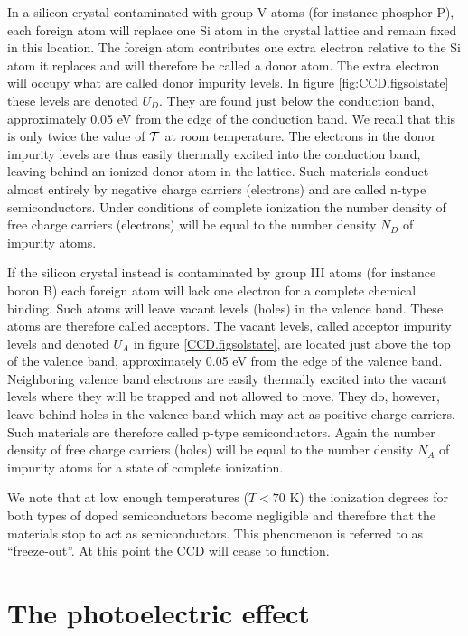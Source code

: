 In a silicon crystal contaminated with group V atoms (for instance
phosphor P), each foreign atom will replace one Si atom in the crystal
lattice and remain fixed in this location. The foreign atom
contributes one extra electron relative to the Si atom it replaces and
will therefore be called a donor atom. The extra electron will occupy
what are called donor impurity levels. In figure \ref{fig:CCD.figsolstate}
these levels are denoted $U_D$. They are found just below the
conduction band, approximately 0.05 eV from the edge of the conduction
band. We recall that this is only twice the value of ${\cal T}$ at room
temperature. The electrons in the donor impurity levels are thus
easily thermally excited into the conduction band, leaving behind an
ionized donor atom in the lattice. Such materials conduct almost
entirely by negative charge carriers (electrons) and are called n-type
semiconductors. Under conditions of complete ionization the number
density of free charge carriers (electrons) will be equal to the
number density $N_D$ of impurity atoms.

If the silicon crystal instead is contaminated by group III atoms (for
instance boron B) each foreign atom will lack one electron for a
complete chemical binding. Such atoms will leave vacant levels (holes)
in the valence band. These atoms are therefore called acceptors.  The
vacant levels, called acceptor impurity levels and denoted $U_A$ in
figure \ref{CCD.figsolstate}, are located just above the top of the
valence band, approximately 0.05 eV from the edge of the valence band.
Neighboring valence band electrons are easily thermally excited into
the vacant levels where they will be trapped and not allowed to
move. They do, however, leave behind holes in the valence band which
may act as positive charge carriers. Such materials are therefore
called p-type semiconductors. Again the number density of free charge
carriers (holes) will be equal to the number density $N_A$ of impurity
atoms for a state of complete ionization.

We note that at low enough temperatures ($T < 70$ K) the ionization
degrees for both types of doped semiconductors become negligible and
therefore that the materials stop to act as semiconductors. This
phenomenon is referred to as ``freeze-out''. At this point the CCD
will cease to function.

\section{The photoelectric effect}

